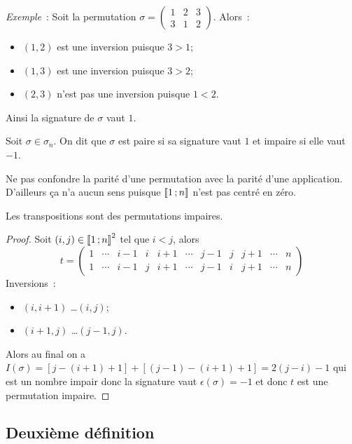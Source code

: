 \emph{Exemple}~: Soit la permutation \(\sigma = \begin{pmatrix} 1 & 2 & 3 \\ 3 &
  1 & 2
\end{pmatrix}
\). Alors~:
\begin{itemize}
  \item \((1,2)\) est une inversion puisque \(3>1\);
  \item \((1,3)\) est une inversion puisque \(3>2\);
  \item \((2,3)\) n'est pas une inversion puisque \(1<2\).
\end{itemize}
Ainsi la signature de \(\sigma\) vaut \(1\).

\begin{defdef}
  Soit \(\sigma \in \sigma_n\). On dit que \(\sigma\) est paire si sa signature
  vaut \(1\) et impaire si elle vaut \(-1\).
\end{defdef}
\danger Ne pas confondre la parité d'une permutation avec la parité d'une
application. D'ailleurs ça n'a aucun sens puisque \(\mathopen{\llbracket}1\mathclose{}\mathpunct{};n\mathclose{\rrbracket}\)
n'est pas centré en zéro.
%
\begin{theo}
  Les transpositions sont des permutations impaires.
\end{theo}
\begin{proof}
  Soit \((i,j) \in \mathopen{\llbracket}1\mathclose{}\mathpunct{};n\mathclose{\rrbracket} ^2\) tel que \(i<j\), alors
  \begin{equation}
    t =
    \begin{pmatrix}
      1 & \cdots & i-1 & i & i+1& \cdots& j-1& j& j+1 &\cdots& n \\
      1 & \cdots & i-1 & j & i+1& \cdots& j-1& i& j+1 &\cdots& n
    \end{pmatrix}
  \end{equation}
  Inversions~:
  \begin{itemize}
    \item \((i,i+1)\) \ldots \((i,j)\);
    \item \((i+1,j)\) \ldots \((j-1,j)\).
  \end{itemize}
  Alors au final on a \(I(\sigma)=[j-(i+1)+1]+[(j-1)-(i+1)+1] = 2(j-i)-1\) qui
  est un nombre impair donc la signature vaut \(\epsilon(\sigma) = -1\) et donc
  \(t\) est une permutation impaire.
\end{proof}

\subsection{Deuxième définition}

